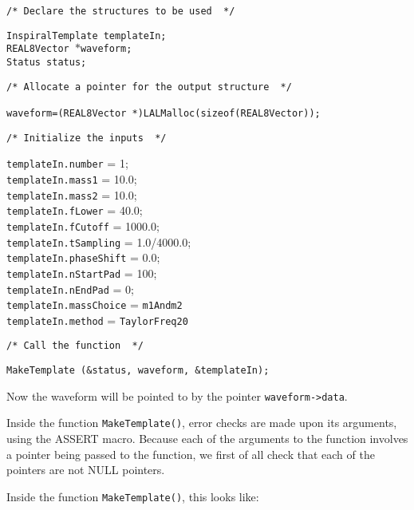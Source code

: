 \documentclass[12pt]{article}
\begin{document}
\noindent
\begin{verbatim}
/* Declare the structures to be used  */
\end{verbatim}
\texttt{InspiralTemplate templateIn;} \\
\texttt{REAL8Vector $\ast$waveform;} \\
\texttt{Status status;} \\
\begin{verbatim}
/* Allocate a pointer for the output structure  */

waveform=(REAL8Vector *)LALMalloc(sizeof(REAL8Vector));

\end{verbatim}
\begin{verbatim}
/* Initialize the inputs  */
\end{verbatim}
\texttt{templateIn.number} = 1;\\
\texttt{templateIn.mass1} = 10.0; \\
\texttt{templateIn.mass2} = 10.0; \\
\texttt{templateIn.fLower} = 40.0; \\
\texttt{templateIn.fCutoff} = 1000.0; \\
\texttt{templateIn.tSampling} = 1.0/4000.0; \\
\texttt{templateIn.phaseShift} = 0.0; \\
\texttt{templateIn.nStartPad} = 100; \\
\texttt{templateIn.nEndPad} = 0; \\
\texttt{templateIn.massChoice} = \texttt{m1Andm2} \\
\texttt{templateIn.method} = \texttt{TaylorFreq20} \\

\begin{verbatim}
/* Call the function  */
\end{verbatim}
\texttt{MakeTemplate (\&status, waveform, \&templateIn);}

\vspace{5mm}

Now the waveform will be pointed to by the pointer \texttt{waveform->data}.

Inside the function \texttt{MakeTemplate()}, error checks are made upon its arguments, using the ASSERT macro. Because each of the arguments to the function involves a pointer being passed to the function, we first of all check that each of the pointers are not NULL pointers.

Inside the function \texttt{MakeTemplate()}, this looks like:
\end{document}
